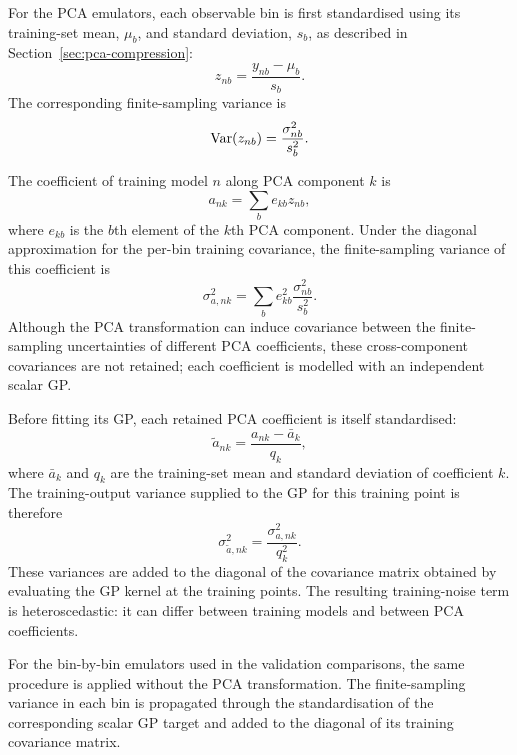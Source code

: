\documentclass[twocolumn, apj, numberedappendix, iop]{openjournal}
\begin{document}
For the PCA emulators, each observable bin is first standardised using its
training-set mean, \(\mu_b\), and standard deviation, \(s_b\), as described in
Section~\ref{sec:pca-compression}:
\begin{equation}
  z_{nb}
  =
  \frac{y_{nb}-\mu_b}{s_b}.
\end{equation}
The corresponding finite-sampling variance is
\begin{equation}
  {\rm Var}(z_{nb})
  =
  \frac{\sigma_{nb}^2}{s_b^2}.
\end{equation}

The coefficient of training model \(n\) along PCA component \(k\) is
\begin{equation}
  a_{nk}
  =
  \sum_b e_{kb}z_{nb},
\end{equation}
where \(e_{kb}\) is the \(b\)th element of the \(k\)th PCA component. Under the
diagonal approximation for the per-bin training covariance, the
finite-sampling variance of this coefficient is
\begin{equation}
  \sigma_{a,nk}^2
  =
  \sum_b e_{kb}^2
  \frac{\sigma_{nb}^2}{s_b^2}.
  \label{eq:pca-training-variance}
\end{equation}
Although the PCA transformation can induce covariance between the
finite-sampling uncertainties of different PCA coefficients, these
cross-component covariances are not retained; each coefficient is modelled
with an independent scalar GP.

Before fitting its GP, each retained PCA coefficient is itself standardised:
\begin{equation}
  \widetilde{a}_{nk}
  =
  \frac{a_{nk}-\bar{a}_k}{q_k},
\end{equation}
where \(\bar{a}_k\) and \(q_k\) are the training-set mean and standard
deviation of coefficient \(k\). The training-output variance supplied to the
GP for this training point is therefore
\begin{equation}
  \sigma_{\widetilde{a},nk}^2
  =
  \frac{\sigma_{a,nk}^2}{q_k^2}.
\end{equation}
These variances are added to the diagonal of the covariance matrix obtained by
evaluating the GP kernel at the training points. The resulting training-noise
term is heteroscedastic: it can differ between training models and between PCA
coefficients.

For the bin-by-bin emulators used in the validation comparisons, the same
procedure is applied without the PCA transformation. The finite-sampling
variance in each bin is propagated through the standardisation of the
corresponding scalar GP target and added to the diagonal of its training
covariance matrix.
\end{document}

